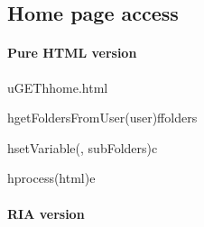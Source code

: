 \documentclass[a4paper, dvipsnames]{article}
\begin{document}
	\pagebreak
	
	\subsection{Home page access}
	
	\paragraph{Pure HTML version}
	
	\begin{center}
		\begin{sequencediagram}
			
			\begin{call}{u}{GET}{h}{home.html}
				\begin{call}{h}{getFoldersFromUser(user)}{f}{folders}
				\end{call}
				\begin{call}{h}{setVariable(, subFolders)}{c}{}
				\end{call}
				\begin{call}{h}{process(html)}{e}{}
				\end{call}
			\end{call}
		\end{sequencediagram}
	\end{center}
	
	\paragraph{RIA version}
	
\end{document}
